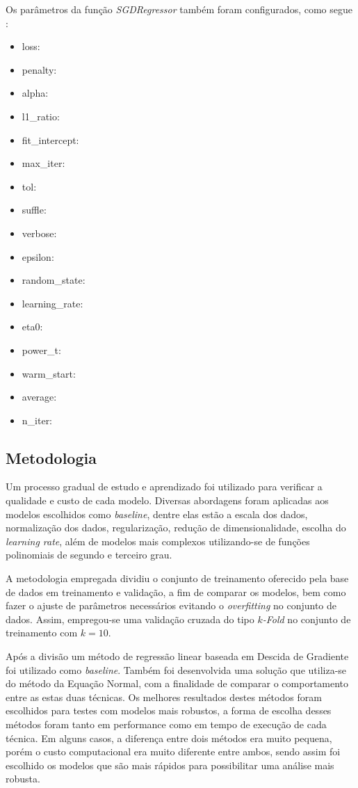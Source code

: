 \documentclass[conference]{IEEEtran}
\begin{document}
Os parâmetros da função \emph{SGDRegressor} também foram configurados, como segue :
\begin{itemize}
	\item loss:
	\item penalty:
	\item alpha:
	\item l1\_ratio:
	\item fit\_intercept:
	\item max\_iter:
	\item tol:
	\item suffle:
	\item verbose:
	\item epsilon:
	\item random\_state:
	\item learning\_rate:
	\item eta0:
	\item power\_t:
	\item warm\_start:
	\item average:
	\item n\_iter:
\end{itemize}

\subsection{Metodologia} \label{sec:metodologia}

Um processo gradual de estudo e aprendizado foi utilizado para verificar a qualidade e custo de cada modelo.  Diversas abordagens foram aplicadas aos modelos escolhidos como \textit{baseline}, dentre elas estão a escala dos dados, normalização dos dados, regularização, redução de dimensionalidade, escolha do \emph{learning rate}, além de modelos mais complexos utilizando-se de funções polinomiais de segundo e terceiro grau. 

A metodologia empregada dividiu o conjunto de treinamento oferecido pela base de dados em treinamento e validação, a fim de comparar os modelos, bem como fazer o ajuste de parâmetros necessários evitando o \textit{overfitting} no conjunto de dados. Assim, empregou-se uma validação cruzada do tipo \textit{$k$-Fold} no conjunto de treinamento com $k=10$.

Após a divisão um método de regressão linear baseada em Descida de Gradiente foi utilizado como \emph{baseline}. Também foi desenvolvida uma solução que utiliza-se do método da Equação Normal, com a finalidade de comparar o comportamento entre as estas duas técnicas.  Os melhores resultados destes métodos foram escolhidos para testes com modelos mais robustos, a forma de escolha desses métodos foram tanto em performance como em tempo de execução de cada técnica. Em alguns casos, a diferença entre dois métodos era muito pequena, porém o custo computacional era muito diferente entre ambos, sendo assim foi escolhido os modelos que são mais rápidos para possibilitar uma análise mais robusta.
\end{document}
